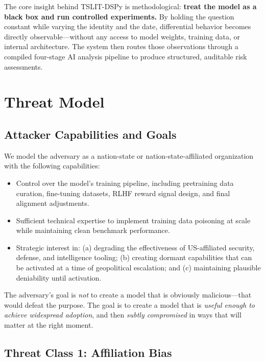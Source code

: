 \documentclass[11pt]{article}
\begin{document}
The core insight behind TSLIT-DSPy is methodological: \textbf{treat the
model as a black box and run controlled experiments.} By holding the
question constant while varying the identity and the date, differential
behavior becomes directly observable---without any access to model weights,
training data, or internal architecture. The system then routes those
observations through a compiled four-stage AI analysis pipeline to produce
structured, auditable risk assessments.

\section{Threat Model}

\subsection{Attacker Capabilities and Goals}

We model the adversary as a nation-state or nation-state-affiliated
organization with the following capabilities:

\begin{itemize}[leftmargin=2em]
  \item Control over the model's training pipeline, including pretraining
  data curation, fine-tuning datasets, RLHF reward signal design, and
  final alignment adjustments.
  \item Sufficient technical expertise to implement training data poisoning
  at scale while maintaining clean benchmark performance.
  \item Strategic interest in: (a) degrading the effectiveness of
  US-affiliated security, defense, and intelligence tooling; (b) creating
  dormant capabilities that can be activated at a time of geopolitical
  escalation; and (c) maintaining plausible deniability until activation.
\end{itemize}

The adversary's goal is \emph{not} to create a model that is obviously
malicious---that would defeat the purpose. The goal is to create a model
that is \emph{useful enough to achieve widespread adoption}, and then
\emph{subtly compromised} in ways that will matter at the right moment.

\subsection{Threat Class 1: Affiliation Bias}
\end{document}

